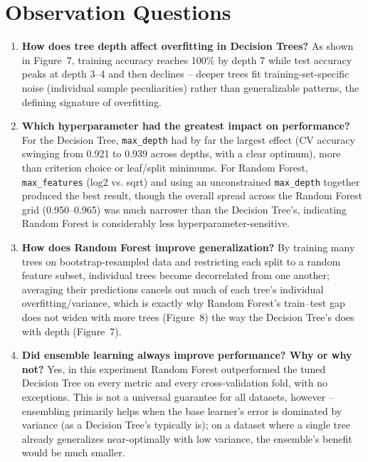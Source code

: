 \documentclass[12pt,a4paper]{article}
\begin{document}
\section{Observation Questions}
\begin{enumerate}
\item \textbf{How does tree depth affect overfitting in Decision Trees?} As shown in
Figure~7, training accuracy reaches 100\% by depth 7 while test accuracy peaks at depth 3--4
and then declines -- deeper trees fit training-set-specific noise (individual sample
peculiarities) rather than generalizable patterns, the defining signature of overfitting.
\item \textbf{Which hyperparameter had the greatest impact on performance?} For the Decision
Tree, \texttt{max\_depth} had by far the largest effect (CV accuracy swinging from 0.921 to
0.939 across depths, with a clear optimum), more than criterion choice or leaf/split minimums.
For Random Forest, \texttt{max\_features} (log2 vs. sqrt) and using an unconstrained
\texttt{max\_depth} together produced the best result, though the overall spread across the
Random Forest grid (0.950--0.965) was much narrower than the Decision Tree's, indicating
Random Forest is considerably less hyperparameter-sensitive.
\item \textbf{How does Random Forest improve generalization?} By training many trees on
bootstrap-resampled data and restricting each split to a random feature subset, individual
trees become decorrelated from one another; averaging their predictions cancels out much of
each tree's individual overfitting/variance, which is exactly why Random Forest's
train--test gap does not widen with more trees (Figure~8) the way the Decision Tree's does
with depth (Figure~7).
\item \textbf{Did ensemble learning always improve performance? Why or why not?} Yes, in this
experiment Random Forest outperformed the tuned Decision Tree on every metric and every
cross-validation fold, with no exceptions. This is not a universal guarantee for all
datasets, however -- ensembling primarily helps when the base learner's error is dominated by
variance (as a Decision Tree's typically is); on a dataset where a single tree already
generalizes near-optimally with low variance, the ensemble's benefit would be much smaller.
\end{enumerate}
\end{document}
